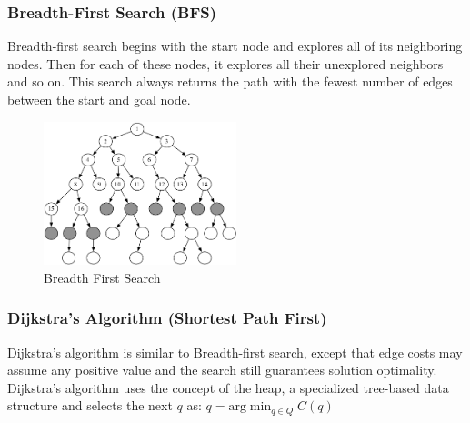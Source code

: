\documentclass[twoside]{article}
\begin{document}
\subsubsection{Breadth-First Search (BFS)}
Breadth-first search begins with the start node and explores all of its neighboring nodes. Then for each of these nodes, it explores all their unexplored neighbors and so on. This search always returns the path with the fewest number of edges between the start and goal node.

\begin{figure}[h!]
\begin{center}
\includegraphics[width=0.5\textwidth]{fig15_9.PNG}
\caption{Breadth First Search}
\end{center}
\end{figure}

\subsubsection{Dijkstra’s Algorithm (Shortest Path First)}
Dijkstra’s algorithm is similar to Breadth-first search, except that edge costs may assume any positive value and the search still guarantees solution optimality. Dijkstra’s algorithm uses the concept of the heap, a specialized tree-based data structure and selects the next $q$ as: $q = \textrm{arg} \min_{q \in Q} C(q)$
\end{document}
